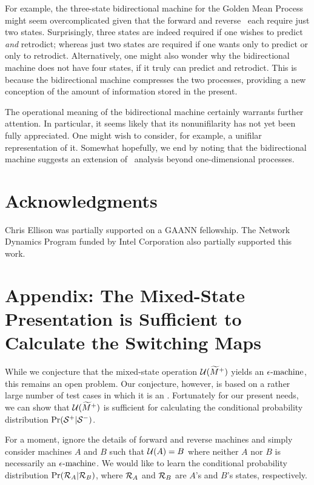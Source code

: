 For example, the three-state bidirectional machine for the Golden Mean Process 
might seem overcomplicated given that the forward and reverse \eMs\ each 
require just two states.  Surprisingly, three states are indeed required if 
one wishes to predict \textit{and} retrodict; whereas just two states are 
required if one wants only to predict or only to retrodict.  Alternatively, 
one might also wonder why the bidirectional machine does not have four states, 
if it truly can predict and retrodict.  This is because the bidirectional 
machine compresses the two processes, providing a new conception of the amount 
of information stored in the present.

The operational meaning
of the bidirectional machine certainly warrants further attention. In 
particular, it seems likely that its nonunifilarity has not yet been fully 
appreciated. One might wish to consider, for example, a unifilar representation 
of it. Somewhat hopefully, we end by noting that the bidirectional machine 
suggests an extension of \eM\ analysis beyond one-dimensional processes.

\section*{Acknowledgments}

Chris Ellison was partially supported on a GAANN fellowship. The Network
Dynamics Program funded by Intel Corporation also partially supported this
work.

\appendix

\section{Appendix: The Mixed-State Presentation is Sufficient to
Calculate the Switching Maps}

While we conjecture that the mixed-state operation $\mathcal{U}(\widetilde{M}^+)$
yields an $\mbox{$\epsilon$-machine}$, this remains an open problem. Our conjecture, however, is
based on a rather large number of test cases in which it is an \eM.
Fortunately for our present needs, we can show that
$\mathcal{U}(\widetilde{M}^+)$ is sufficient for
calculating the conditional probability distribution
$\Pr({\mathcal{S}}^{+} | {\mathcal{S}}^{-})$.

For a moment, ignore the details of forward and reverse machines and simply
consider machines $A$ and $B$ such that $\mathcal{U}(A) = B$ where neither $A$ nor $B$ is
necessarily an $\mbox{$\epsilon$-machine}$. We would like to learn the conditional probability
distribution $\Pr(\mathcal{R}_A | \mathcal{R}_B)$, where
$\mathcal{R}_A$ and $\mathcal{R}_B$ are $A$'s and $B$'s states,
respectively.

